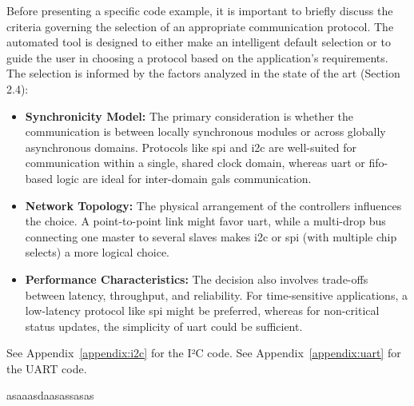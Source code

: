 Before presenting a specific code example, it is important to briefly discuss the criteria governing the selection of an appropriate communication protocol. The automated tool is designed to either make an intelligent default selection or to guide the user in choosing a protocol based on the application's requirements. The selection is informed by the factors analyzed in the state of the art (Section 2.4):

\begin{itemize}
    \item \textbf{Synchronicity Model:} The primary consideration is whether the communication is between locally synchronous modules or across globally asynchronous domains. Protocols like \gls{spi} and \gls{i2c} are well-suited for communication within a single, shared clock domain, whereas \gls{uart} or \gls{fifo}-based logic are ideal for inter-domain \gls{gals} communication.
    \item \textbf{Network Topology:} The physical arrangement of the controllers influences the choice. A point-to-point link might favor \gls{uart}, while a multi-drop bus connecting one master to several slaves makes \gls{i2c} or \gls{spi} (with multiple chip selects) a more logical choice.
    \item \textbf{Performance Characteristics:} The decision also involves trade-offs between latency, throughput, and reliability. For time-sensitive applications, a low-latency protocol like \gls{spi} might be preferred, whereas for non-critical status updates, the simplicity of \gls{uart} could be sufficient. 
\end{itemize}

See Appendix~\ref{appendix:i2c} for the I²C code.
See Appendix~\ref{appendix:uart} for the UART code.

asaaasdaasassasas
